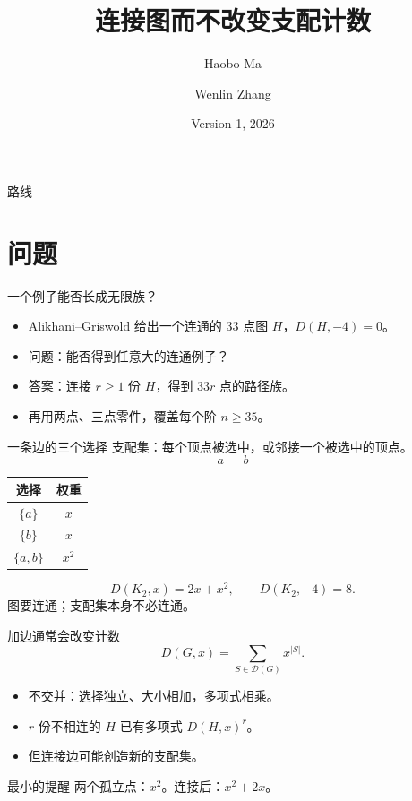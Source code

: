 \documentclass{beamer}
\title{连接图而不改变支配计数}
\author{Haobo Ma \and Wenlin Zhang}
\date{Version 1, 2026}
\begin{document}
\begin{frame}
\titlepage
{}
\end{frame}
\begin{frame}{路线}
\tableofcontents
{}
\end{frame}
\section{问题}
\begin{frame}{一个例子能否长成无限族？}
\begin{itemize}
\item Alikhani--Griswold 给出一个连通的 33 点图 $H$，$D(H,-4)=0$。
\item 问题：能否得到任意大的连通例子？
\item 答案：连接 $r\geq1$ 份 $H$，得到 $33r$ 点的路径族。
\item 再用两点、三点零件，覆盖每个阶 $n\geq35$。
\end{itemize}
\end{frame}
\begin{frame}{一条边的三个选择}
支配集：每个顶点被选中，或邻接一个被选中的顶点。
\[
 a\;\text{---}\;b
\]
\begin{center}\begin{tabular}{c|c}
选择 & 权重\\\hline
$\{a\}$ & $x$\\
$\{b\}$ & $x$\\
$\{a,b\}$ & $x^2$
\end{tabular}\end{center}
\[D(K_2,x)=2x+x^2,\qquad D(K_2,-4)=8.\]
图要连通；支配集本身不必连通。
\end{frame}
\begin{frame}{加边通常会改变计数}
\[D(G,x)=\sum_{S\in\mathcal D(G)}x^{|S|}.\]
\begin{itemize}
\item 不交并：选择独立、大小相加，多项式相乘。
\item $r$ 份不相连的 $H$ 已有多项式 $D(H,x)^r$。
\item 但连接边可能创造新的支配集。
\end{itemize}
\begin{alertblock}{最小的提醒}
两个孤立点：$x^2$。连接后：$x^2+2x$。
\end{alertblock}
\end{frame}
\end{document}

